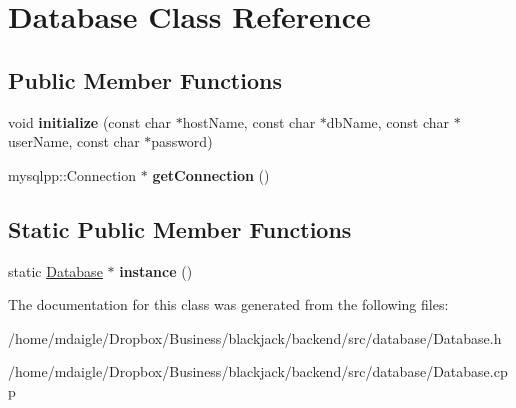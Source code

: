 \hypertarget{classDatabase}{
\section{\-Database \-Class \-Reference}
\label{classDatabase}
}
\subsection*{\-Public \-Member \-Functions}
\begin{DoxyCompactItemize}
\item 
\hypertarget{classDatabase_a3843f837fbcd5216be140b20535435f4}{
void {\bfseries initialize} (const char $\ast$host\-Name, const char $\ast$db\-Name, const char $\ast$user\-Name, const char $\ast$password)}
\label{classDatabase_a3843f837fbcd5216be140b20535435f4}

\item 
\hypertarget{classDatabase_a0e87253f51483ac02170577e90f23973}{
mysqlpp\-::\-Connection $\ast$ {\bfseries get\-Connection} ()}
\label{classDatabase_a0e87253f51483ac02170577e90f23973}

\end{DoxyCompactItemize}
\subsection*{\-Static \-Public \-Member \-Functions}
\begin{DoxyCompactItemize}
\item 
\hypertarget{classDatabase_aa334760d1e18f82a344fb696547bfa5c}{
static \hyperlink{classDatabase}{\-Database} $\ast$ {\bfseries instance} ()}
\label{classDatabase_aa334760d1e18f82a344fb696547bfa5c}

\end{DoxyCompactItemize}


\-The documentation for this class was generated from the following files\-:\begin{DoxyCompactItemize}
\item 
/home/mdaigle/\-Dropbox/\-Business/blackjack/backend/src/database/\-Database.\-h\item 
/home/mdaigle/\-Dropbox/\-Business/blackjack/backend/src/database/\-Database.\-cpp\end{DoxyCompactItemize}
